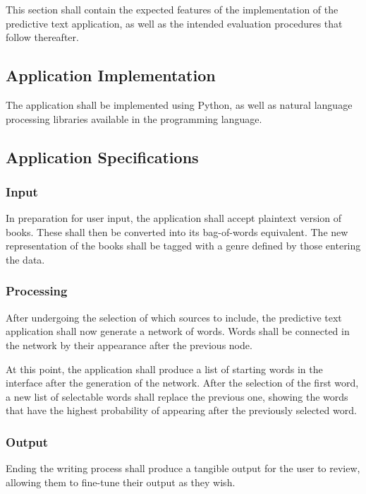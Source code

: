 \documentclass[journal]{./IEEE/IEEEtran}
\begin{document}


This section shall contain the expected features of the implementation of the predictive text application, as well as the intended evaluation procedures that follow thereafter.

\subsection{Application Implementation}
The application shall be implemented using Python, as well as natural language processing libraries available in the programming language.

\subsection{Application Specifications}
\subsubsection{Input}
In preparation for user input, the application shall accept plaintext version of books. These shall then be converted into its bag-of-words equivalent. The new representation of the books shall be tagged with a genre defined by those entering the data.

\subsubsection{Processing}
After undergoing the selection of which sources to include, the predictive text application shall now generate a network of words. Words shall be connected in the network by their appearance after the previous node. 


At this point, the application shall produce a list of starting words in the interface after the generation of the network. After the selection of the first word, a new list of selectable words shall replace the previous one, showing the words that have the highest probability of appearing after the previously selected word.

\subsubsection{Output}
Ending the writing process shall produce a tangible output for the user to review, allowing them to fine-tune their output as they wish.
\end{document}
